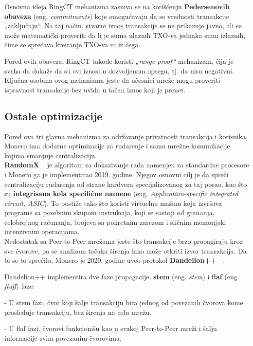 \documentclass[12pt,a4paper]{article}
\begin{document}
Osnovna ideja RingCT mehanizma zasniva se na korišćenju \textbf{Pedersenovih obaveza} (eng. \textit{commitments}) koje omogućavaju da se vrednosti transakcije „zaključaju“. Na taj način, stvarni iznos transakcije se ne prikazuje javno, ali se može matematički proveriti da li je suma ulaznih TXO-va jednaka sumi izlaznih, čime se sprečava kreiranje TXO-va ni iz čega.

Pored ovih obaveza, RingCT takođe koristi \textit{„range proof“} mehanizam, čija je svrha da dokaže da su svi iznosi u dozvoljenom opsegu, tj. da nisu negativni. Ključna osobina ovog mehanizma jeste da učesnici mreže mogu proveriti ispravnost transakcije bez uvida u tačan iznos koji je prenet.

\subsection{Ostale optimizacije}
Pored ova tri glavna mehanizma za održavanje privatnosti transakcija i korisnika, Monero ima dodatne optimizacije za rudarenje i samu mrežne komunikacije kojima smanjuje centralizaciju.\\

\textbf{RandomX} ~\cite{randomX} je algoritam za dokazivanje rada namenjen za standardne procesore i Monero ga je implementirao 2019. godine. Njegov osnovni cilj je da spreči centralizaciju rudarenja od strane hardvera specijalizovanog za taj posao, kao što su \textbf{integrisana kola specifične namene} (eng. \textit{Application-specific integrated circuit, ASIC}). To postiže tako što koristi virtuelnu mašinu koja izvršava programe sa posebnim skupom instrukcija, koji se sastoji od grananja, celobrojnog računanja, brojeva sa pokretnim zarezom i sličnim memorijski intenzivnim operacijama.\\

Nedostatak sa Peer-to-Peer mrežama jeste što transakcije brzo propagiraju kroz sve čvorove, pa se analizom tačaka širenja lako može otkriti izvor transakcija. Da bi se to sprečilo, Monero je 2020. godine uveo protokol \textbf{Dandelion++} ~\cite{dandelion++}.

Dandelion++ implementira dve faze propagacije, \textbf{stem} (eng. \textit{stem}) i \textbf{flaf} (eng. \textit{fluff}) faze:

    -	U stem fazi, čvor koji šalje transakciju bira jednog od povezanih čvorova kome prosleđuje transakciju, bez širenja na celu mrežu. 

    -	U flaf fazi, čvorovi funkcionišu kao u svakoj Peer-to-Peer mreži i šalju informacije svim povezanim čvorovima.\\
\end{document}
